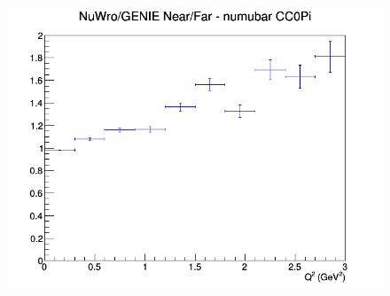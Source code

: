 \documentclass[12pt]{article}
\begin{document}
\begin{figure}[h]
\endminipage
{}
\includegraphics[width=\linewidth]{eff_Q2/LAr/ratios/CC0Pi_NuWro_GENIE_numubar_NF_Q2.png}
\endminipage
\newline
\end{figure}
\clearpage
\end{document}
